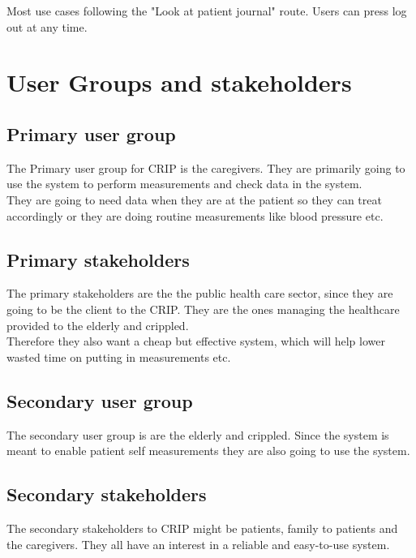 Most use cases following the "Look at patient journal" route. Users can press log out at any time. 


\section{User Groups and stakeholders}
\subsection{Primary user group}
The Primary user group for CRIP is the caregivers. They are primarily going to use the system to perform measurements and check data in the system.\\
They are going to need data when they are at the patient so they can treat accordingly or they are doing routine measurements like blood pressure etc.\\


\subsection{Primary stakeholders}
The primary stakeholders are the the public health care sector, since they are going to be the client to the CRIP. They are the ones managing the healthcare provided to the elderly and crippled.\\
Therefore they also want a cheap but effective system, which will help lower wasted time on putting in measurements etc.\\

\subsection{Secondary user group}
The secondary user group is are the elderly and crippled. Since the system is meant to enable patient self measurements they are also going to use the system.\\


\subsection{Secondary stakeholders}
The secondary stakeholders to CRIP might be patients, family to patients and the caregivers. They all have an interest in a reliable and easy-to-use system.\\

